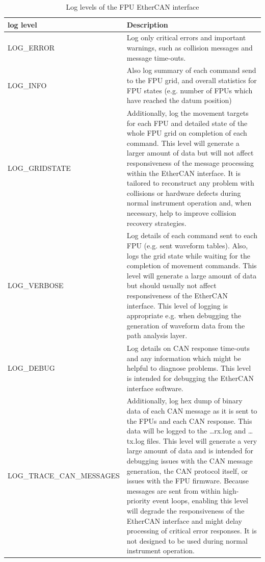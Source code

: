 \documentclass[11pt,a4paper]{report}
\begin{document}
\begin{table}
  \begin{centering}
\begin{tabular}{|l|p{}|}
  \hline
  \textbf{log level} & \textbf{Description} \\
  \hline
    LOG\_ERROR & 
    Log only critical errors and important warnings, such as collision
    messages and message time-outs. \\

    \hline
    LOG\_INFO & 
    Also log summary of each command send to the FPU grid, and
    overall statistics for FPU states (e.g. number of FPUs which
    have reached the datum position) \\

    \hline
    LOG\_GRIDSTATE &
    Additionally, log the movement targets for each
    FPU and detailed state of the whole FPU grid on completion of each
    command.  This level will generate a larger amount of data but
    will not affect responsiveness of the message processing within
    the EtherCAN interface.  It is tailored to reconstruct any problem with
    collisions or hardware defects during normal instrument operation
    and, when necessary, help to improve collision recovery
    strategies. \\

    \hline
    LOG\_VERBOSE &

    Log details of each command sent to each FPU
    (e.g. sent waveform tables). Also, logs the grid state while
    waiting for the completion of movement commands. This level will
    generate a large amount of data but should usually not affect
    responsiveness of the EtherCAN interface. This level of logging is appropriate
    e.g. when debugging the generation of waveform data from the path
    analysis layer. \\

    \hline
    LOG\_DEBUG &
    Log details on CAN response time-outs and any information which
    might be helpful to diagnose problems. This level is intended
    for debugging the EtherCAN interface software.\\

    \hline LOG\_TRACE\_CAN\_MESSAGES & Additionally, log hex dump of
    binary data of each CAN message as it is sent to the FPUs and each
    CAN response. This data will be logged to the \ldots{}rx.log and
    \ldots{}tx.log files. This level will generate a very large amount
    of data and is intended for debugging issues with the CAN message
    generation, the CAN protocol itself, or issues with the FPU
    firmware. Because messages are sent from within high-priority
    event loops, enabling this level will degrade the responsiveness
    of the EtherCAN interface and might delay processing of critical error
    responses. It is not designed to be used during normal instrument
    operation. \\
 
  
  \hline
\end{tabular}
\end{centering}
\caption{Log levels of the FPU EtherCAN interface}
\label{tab:loglevels}
\end{table}
\end{document}
